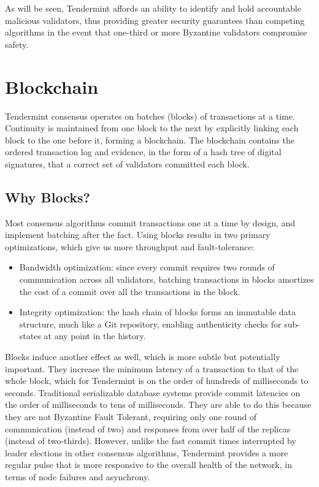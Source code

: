 As will be seen, Tendermint affords an ability to identify and hold accountable malicious validators, thus providing greater security guarantees than competing algorithms in the event that one-third or more Byzantine validators compromise safety.

\section{Blockchain}

Tendermint consensus operates on batches (blocks) of transactions at a time.
Continuity is maintained from one block to the next by explicitly linking each block to the one before it,
forming a blockchain. 
The blockchain contains the ordered transaction log and evidence,
in the form of a hash tree of digital signatures,
that a correct set of validators committed each block.

\subsection{Why Blocks?}
Most consensus algorithms commit transactions one at a time by design, and implement batching after the fact.
Using blocks results in two primary optimizations, which give us more throughput and fault-tolerance:

\begin{itemize}
\item{Bandwidth optimization: since every commit requires two rounds of communication across all validators, 
	batching transactions in blocks amortizes the cost of a commit over all the transactions in the block.}
\item{Integrity optimization: the hash chain of blocks forms an immutable data structure, much like a Git repository, enabling authenticity checks for sub-states at any point in the history.}
\end{itemize}

Blocks induce another effect as well, which is more subtle but potentially important. 
They increase the minimum latency of a transaction to that of the whole block, which for Tendermint is on the order of hundreds of milliseconds to seconds.
Traditional serializable database systems provide commit latencies on the order of milliseconds to tens of milliseconds.
They are able to do this because they are not Byzantine Fault Tolerant, requiring only one round of communication (instead of two)
and responses from over half of the replicas (instead of two-thirds).
However, unlike the fast commit times interrupted by leader elections in other consensus algorithms,
Tendermint provides a more regular pulse that is more responsive to the overall health of the network, in terms of node failures and asynchrony.

